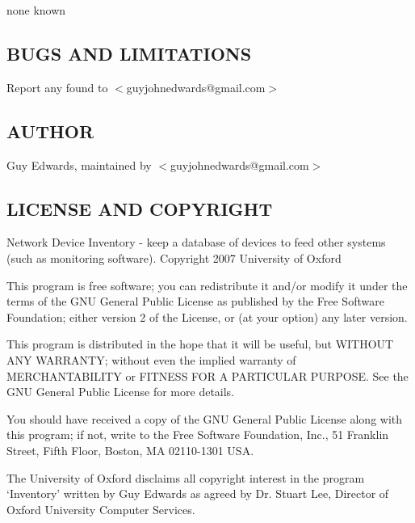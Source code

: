 \documentclass{book}
\begin{document}
none known


\subsection{BUGS AND LIMITATIONS}
\label{Inventory_BUGS_AND_LIMITATIONS}
\hypertarget{Inventory_BUGS_AND_LIMITATIONS}{}



Report any found to $<$guyjohnedwards@gmail.com$>$


\subsection{AUTHOR}
\label{Inventory_AUTHOR}
\hypertarget{Inventory_AUTHOR}{}



Guy Edwards, maintained by $<$guyjohnedwards@gmail.com$>$


\subsection{LICENSE AND COPYRIGHT}
\label{Inventory_LICENSE_AND_COPYRIGHT}
\hypertarget{Inventory_LICENSE_AND_COPYRIGHT}{}



Network Device Inventory - keep a database of devices to feed other systems (such as monitoring software). Copyright 2007 University of Oxford



This program is free software; you can redistribute it and/or modify it under the terms of the GNU General Public License as published by the Free Software Foundation; either version 2 of the License, or (at your option) any later version.



This program is distributed in the hope that it will be useful, but WITHOUT ANY WARRANTY; without even the implied warranty of MERCHANTABILITY or FITNESS FOR A PARTICULAR PURPOSE. See the GNU General Public License for more details.



You should have received a copy of the GNU General Public License along with this program; if not, write to the Free Software Foundation, Inc., 51 Franklin Street, Fifth Floor, Boston, MA 02110-1301 USA.



The University of Oxford disclaims all copyright interest in the program `Inventory' written by Guy Edwards as agreed by Dr. Stuart Lee, Director of Oxford University Computer Services.
\end{document}
